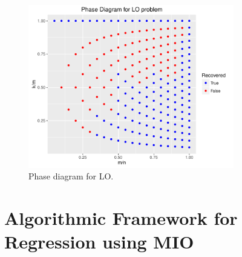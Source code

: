 \documentclass[12pt]{article}
\newcommand{\1}{\mathds{1}}
\begin{document}
\begin{figure}[tb]
  \centering
  \includegraphics[width=0.8\textwidth]{phase_LO}
  \caption{Phase diagram for LO.}\label{fig:LO_phase}
\end{figure}

\section{Algorithmic Framework for Regression using MIO}
\end{document}
